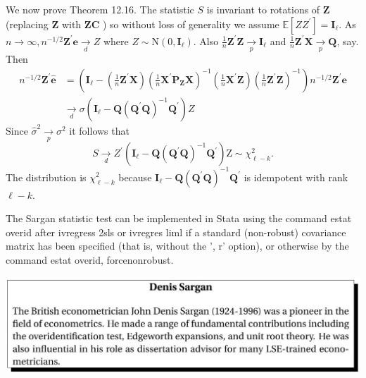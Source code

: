 \documentclass[10pt]{article}
\begin{document}
We now prove Theorem 12.16. The statistic $S$ is invariant to rotations of $\boldsymbol{Z}$ (replacing $\boldsymbol{Z}$ with $\boldsymbol{Z} \boldsymbol{C}$ ) so without loss of generality we assume $\mathbb{E}\left[Z Z^{\prime}\right]=\boldsymbol{I}_{\ell}$. As $n \rightarrow \infty, n^{-1 / 2} \boldsymbol{Z}^{\prime} \boldsymbol{e} \underset{d}{\rightarrow} Z$ where $Z \sim \mathrm{N}\left(0, \boldsymbol{I}_{\ell}\right)$. Also $\frac{1}{n} \boldsymbol{Z}^{\prime} \boldsymbol{Z} \underset{p}{\longrightarrow} \boldsymbol{I}_{\ell}$ and $\frac{1}{n} \boldsymbol{Z}^{\prime} \boldsymbol{X} \underset{p}{\longrightarrow} \boldsymbol{Q}$, say. Then
$$
\begin{aligned}
n^{-1 / 2} \boldsymbol{Z}^{\prime} \widehat{\boldsymbol{e}} &=\left(\boldsymbol{I}_{\ell}-\left(\frac{1}{n} \boldsymbol{Z}^{\prime} \boldsymbol{X}\right)\left(\frac{1}{n} \boldsymbol{X}^{\prime} \boldsymbol{P}_{\boldsymbol{Z}} \boldsymbol{X}\right)^{-1}\left(\frac{1}{n} \boldsymbol{X}^{\prime} \boldsymbol{Z}\right)\left(\frac{1}{n} \boldsymbol{Z}^{\prime} \boldsymbol{Z}\right)^{-1}\right) n^{-1 / 2} \boldsymbol{Z}^{\prime} \boldsymbol{e} \\
& \underset{d}{\rightarrow} \sigma\left(\boldsymbol{I}_{\ell}-\boldsymbol{Q}\left(\boldsymbol{Q}^{\prime} \boldsymbol{Q}\right)^{-1} \boldsymbol{Q}^{\prime}\right) Z
\end{aligned}
$$
Since $\widehat{\sigma}^{2} \underset{p}{\rightarrow} \sigma^{2}$ it follows that
$$
S \underset{d}{\rightarrow} Z^{\prime}\left(\boldsymbol{I}_{\ell}-\boldsymbol{Q}\left(\boldsymbol{Q}^{\prime} \boldsymbol{Q}\right)^{-1} \boldsymbol{Q}^{\prime}\right) \mathrm{Z} \sim \chi_{\ell-k}^{2} .
$$
The distribution is $\chi_{\ell-k}^{2}$ because $\boldsymbol{I}_{\ell}-\boldsymbol{Q}\left(\boldsymbol{Q}^{\prime} \boldsymbol{Q}\right)^{-1} \boldsymbol{Q}^{\prime}$ is idempotent with rank $\ell-k$.

The Sargan statistic test can be implemented in Stata using the command estat overid after ivregress 2sls or ivregres liml if a standard (non-robust) covariance matrix has been specified (that is, without the ', r' option), or otherwise by the command estat overid, forcenonrobust.

\includegraphics[max width=\textwidth]{2022_09_17_f9391324ededdbb7a34eg-47}
\end{document}
